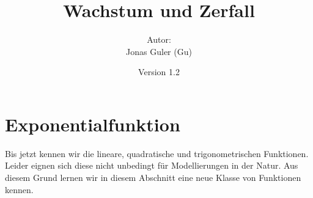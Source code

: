 \documentclass[11pt,oneside]{article}
\newcommand{\Skriptname}{Wachstum und Zerfall}
\newcommand{\Autor}{Jonas Guler (Gu)}
\begin{document}
\begin{titlepage}
	\clearpage
	\title{\Huge\textbf{\Skriptname} \\[1.5cm]}
	\author{Autor:\\ \Autor}
	\date{\normalsize {Version 1.2}\\ \datelong}
	\maketitle
	\thispagestyle{empty}
	\vfill
	\tableofcontents
\end{titlepage}
\section{Exponentialfunktion}
	Bis jetzt kennen wir die lineare, quadratische und trigonometrischen Funktionen. Leider eignen sich diese nicht unbedingt für Modellierungen in der Natur. Aus diesem Grund lernen wir in diesem Abschnitt eine neue Klasse von Funktionen kennen.
\end{document}
